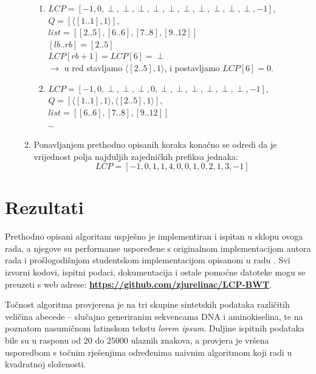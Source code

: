 \documentclass[a4paper,12pt]{article}
\begin{document}
\begin{enumerate}
\begin{enumerate}
\begin{enumerate}
				\item $LCP = [-1,0,\perp,\perp,\perp,\perp,\perp,\perp,\perp,\perp,\perp, \perp, -1]$,\\
			   	$Q = [\langle[1..1],1\rangle]$,\\
			    $list = [[2..5],[6..6],[7..8],[9..12]]$\\
			    
				$[lb .. rb] = [2..5]$\\

				$LCP[rb+1]=LCP[6]=\perp$\\
				$\rightarrow$ u red stavljamo $\langle[2..5],1\rangle$, i postavljamo $LCP[6]=0$.
				\newline
				\item $LCP = [-1,0,\perp,\perp,\perp,0,\perp,\perp,\perp,\perp,\perp, \perp, -1]$,\\
				$Q = [\langle[1..1],1\rangle, \langle[2..5],1\rangle]$,\\
			    $list = [[6..6],[7..8],[9..12]]$\\
				\ldots
			\end{enumerate}

      	\item Ponavljanjem prethodno opisanih koraka konačno se odredi da je vrijednost polja najduljih zajedničkih prefiksa jednaka: 
		$$ LCP = [-1,0,1,1,4,0,0,1,0,2,1,3,-1] $$
	\end{enumerate}
\end{enumerate}


\section{Rezultati}

Prethodno opisani algoritam uspješno je implementiran i ispitan u sklopu ovoga rada, a njegove su performanse uspoređene s originalnom implementacijom autora rada \cite{beller2013} i prošlogodišnjom studentskom implementacijom opisanom u radu \cite{studenti2017}. Svi izvorni kodovi, ispitni podaci, dokumentacija i ostale pomoćne datoteke mogu se preuzeti s web adrese: \textbf{\href{https://github.com/zjurelinac/LCP-BWT}{https://github.com/zjurelinac/LCP-BWT}}.

Točnost algoritma provjerena je na tri skupine sintetskih podataka različitih veličina abecede -- slučajno generiranim sekvencama DNA i aminokiselina, te na poznatom nasumičnom latinskom tekstu \textit{lorem ipsum}. Duljine ispitnih podataka bile su u rasponu od $20$ do $25000$ ulaznih znakova, a provjera je vršena usporedbom s točnim rješenjima određenima naivnim algoritmom koji radi u kvadratnoj složenosti.
\end{document}

